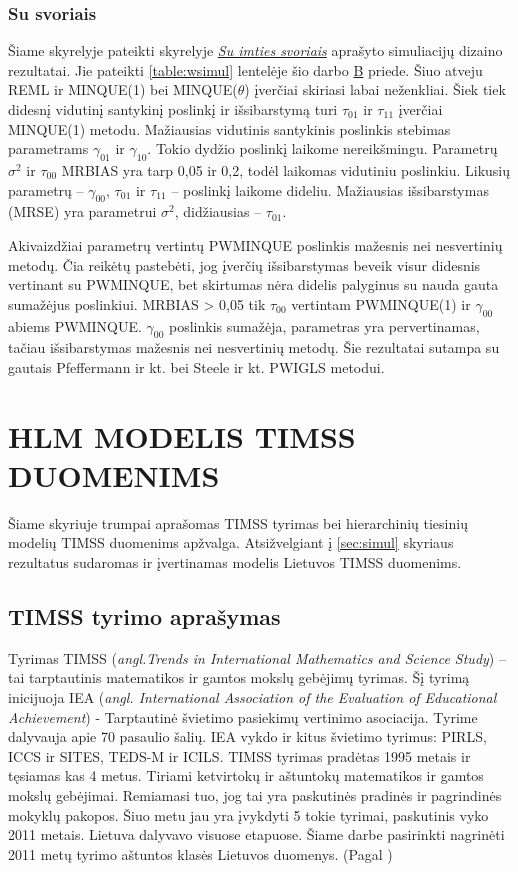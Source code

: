 \documentclass[11pt,a4paper]{article}
\begin{document}
\subsubsection*{Su svoriais}
\indent Šiame skyrelyje pateikti skyrelyje \hyperlink{susvoriais}{\textit{Su imties svoriais}} aprašyto simuliacijų dizaino rezultatai. Jie pateikti \ref{table:wsimul} lentelėje šio darbo \hyperlink{appendixb}{B} priede. Šiuo atveju REML ir MINQUE(1) bei MINQUE($\theta$) įverčiai skiriasi labai neženkliai. Šiek tiek didesnį vidutinį santykinį poslinkį ir išsibarstymą turi $\tau_{01}$ ir $\tau_{11}$ įverčiai MINQUE(1) metodu. Mažiausias vidutinis santykinis poslinkis stebimas parametrams $\gamma_{01}$ ir $\gamma_{10}$. Tokio dydžio poslinkį laikome nereikšmingu. Parametrų $\sigma^2$ ir $\tau_{00}$ MRBIAS yra tarp 0,05 ir 0,2, todėl laikomas vidutiniu poslinkiu. Likusių parametrų -- $\gamma_{00}$, $\tau_{01}$ ir $\tau_{11}$ -- poslinkį laikome dideliu. Mažiausias išsibarstymas (MRSE) yra parametrui $\sigma^2$, didžiausias -- $\tau_{01}$. 

\indent Akivaizdžiai parametrų vertintų PWMINQUE poslinkis mažesnis nei nesvertinių metodų. Čia reikėtų pastebėti, jog įverčių išsibarstymas beveik visur didesnis vertinant su PWMINQUE, bet skirtumas nėra didelis palyginus su nauda gauta sumažėjus poslinkiui.    MRBIAS > 0,05 tik $\tau_{00}$ vertintam PWMINQUE(1) ir $\gamma_{00}$ abiems PWMINQUE. $\gamma_{00}$ poslinkis sumažėja, parametras yra pervertinamas, tačiau išsibarstymas mažesnis nei nesvertinių metodų. Šie rezultatai sutampa su gautais  Pfeffermann ir kt.\cite{pfeff} bei Steele ir kt.\cite{mlwin} PWIGLS metodui.


\newpage
\section{HLM MODELIS TIMSS DUOMENIMS} \label{sec:timss}
\indent Šiame skyriuje trumpai aprašomas TIMSS tyrimas bei hierarchinių tiesinių modelių TIMSS duomenims apžvalga. Atsižvelgiant į \ref{sec:simul} skyriaus rezultatus sudaromas ir įvertinamas modelis Lietuvos TIMSS duomenims.

\subsection{TIMSS tyrimo aprašymas} \label{subsec:timss1}

\indent Tyrimas TIMSS (\textit{angl.Trends in International Mathematics and Science Study}) – tai tarptautinis matematikos ir gamtos mokslų gebėjimų tyrimas. Šį tyrimą inicijuoja IEA (\textit{angl. International Association of the Evaluation of Educational Achievement}) - Tarptautinė švietimo pasiekimų vertinimo asociacija. Tyrime dalyvauja apie 70 pasaulio šalių. IEA vykdo ir kitus švietimo tyrimus: PIRLS, ICCS ir SITES, TEDS-M ir ICILS. TIMSS tyrimas pradėtas 1995 metais ir tęsiamas kas 4 metus. Tiriami ketvirtokų ir aštuntokų matematikos ir gamtos mokslų gebėjimai. Remiamasi tuo, jog tai yra paskutinės pradinės ir pagrindinės mokyklų pakopos. Šiuo metu jau yra įvykdyti 5 tokie tyrimai, paskutinis vyko 2011 metais. Lietuva dalyvavo visuose etapuose. Šiame darbe pasirinkti nagrinėti 2011 metų tyrimo aštuntos klasės Lietuvos duomenys. (Pagal \cite{timss2011lt})
\end{document}
